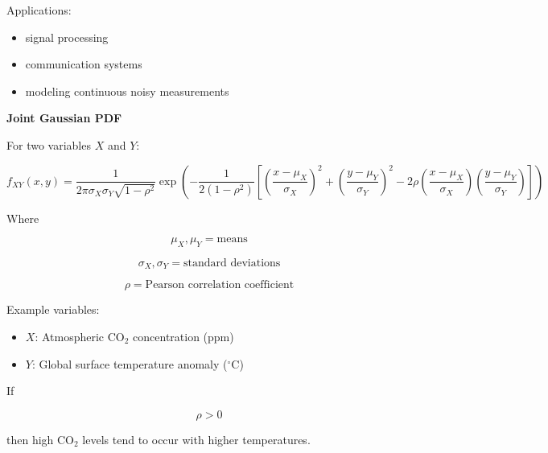 \documentclass{article}
\begin{document}
Applications:

\begin{itemize}
\item signal processing
\item communication systems
\item modeling continuous noisy measurements
\end{itemize}

\textbf{Joint Gaussian PDF}

For two variables $X$ and $Y$:

\[
f_{XY}(x,y)=\frac{1}{2\pi\sigma_X\sigma_Y\sqrt{1-\rho^2}}
\exp\left(
-\frac{1}{2(1-\rho^2)}
\left[
\left(\frac{x-\mu_X}{\sigma_X}\right)^2
+
\left(\frac{y-\mu_Y}{\sigma_Y}\right)^2
-
2\rho
\left(\frac{x-\mu_X}{\sigma_X}\right)
\left(\frac{y-\mu_Y}{\sigma_Y}\right)
\right]
\right)
\]

Where

\[
\mu_X, \mu_Y = \text{means}
\]

\[
\sigma_X, \sigma_Y = \text{standard deviations}
\]

\[
\rho = \text{Pearson correlation coefficient}
\]

Example variables:

\begin{itemize}
\item $X$: Atmospheric CO$_2$ concentration (ppm)
\item $Y$: Global surface temperature anomaly ($^\circ$C)
\end{itemize}

If

\[
\rho>0
\]

then high CO$_2$ levels tend to occur with higher temperatures.
\end{document}
